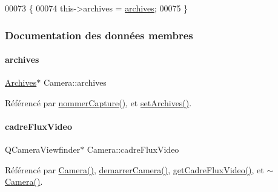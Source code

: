 \begin{DoxyCode}
00073 \{
00074     this->archives = \hyperlink{class_camera_a5eb3a29aeeab2f2755d0b69ac7cf550a}{archives};
00075 \}
\end{DoxyCode}


\subsubsection{Documentation des données membres}
\mbox{\label{class_camera_a5eb3a29aeeab2f2755d0b69ac7cf550a}} 
\paragraph{\texorpdfstring{archives}{archives}}
{\footnotesize\ttfamily \hyperlink{class_archives}{Archives}$\ast$ Camera\+::archives\hspace{0.3cm}{\ttfamily [private]}}



Référencé par \hyperlink{class_camera_a60d2c9f16b6f235ab6dd0360c883e0d0}{nommer\+Capture()}, et \hyperlink{class_camera_a66b844eec2b721a6ac23b80cb3fe2426}{set\+Archives()}.

\mbox{\label{class_camera_abf5fd38d19f0f06dfd7ec9e37f73adb8}} 
\paragraph{\texorpdfstring{cadre\+Flux\+Video}{cadreFluxVideo}}
{\footnotesize\ttfamily Q\+Camera\+Viewfinder$\ast$ Camera\+::cadre\+Flux\+Video\hspace{0.3cm}{\ttfamily [private]}}



Référencé par \hyperlink{class_camera_ae3aa4afd7a3d9ddc2bf710bc74dc293e}{Camera()}, \hyperlink{class_camera_a7eb23e1a5fe67c61f36b8a97ff1f882c}{demarrer\+Camera()}, \hyperlink{class_camera_a67420d3ef14065a412327ada6193a2e0}{get\+Cadre\+Flux\+Video()}, et \hyperlink{class_camera_ad1897942d0ccf91052386388a497349f}{$\sim$\+Camera()}.

\mbox{\label{class_camera_a282a199ddd33fe64bc27b32a55719054}} 
